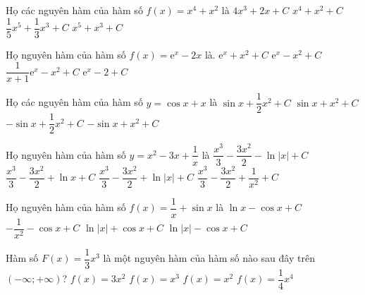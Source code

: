 \begin{ex}
	Họ các nguyên hàm của hàm số $ f(x)=x^4+x^2$ là
	\choice
	{$ 4x^3+2x+C$}
	{$x^4+x^2+C$}
	{\True $\dfrac{1}{5}{x^5}+\dfrac{1}{3}{x^3}+C$}
	{$x^5+x^3+C$}
\end{ex}
\begin{ex}
	Họ nguyên hàm của hàm số $ f(x)=\mathrm{e}^x-2x$ là.
	\choice
	{$\mathrm{e}^x+x^2+C$}
	{\True $\mathrm{e}^x-x^2+C$}
	{$\dfrac{1}{x+1}{\mathrm{e}^x}-x^2+C$}
	{$\mathrm{e}^x-2+C$}
\end{ex}
\begin{ex}
	Họ các nguyên hàm của hàm số $y=\cos x+x$ là
	\choice
	{\True $\sin x+\dfrac{1}{2}{x^2}+C$}
	{$\sin x+x^2+C$}
	{$-\sin x+\dfrac{1}{2}{x^2}+C$}
	{$-\sin x+x^2+C$}
\end{ex}
\begin{ex}
	Họ nguyên hàm của hàm số $y=x^2-3x+\dfrac{1}{x}$ là
	\choice
	{$\dfrac{x^3}{3}-\dfrac{3x^2}{2}-\ln\left| x\right|+C$}
	{$\dfrac{x^3}{3}-\dfrac{3x^2}{2}+\ln x+C$}
	{\True $\dfrac{x^3}{3}-\dfrac{3x^2}{2}+\ln\left| x\right|+C$}
	{$\dfrac{x^3}{3}-\dfrac{3x^2}{2}+\dfrac{1}{x^2}+C$}
\end{ex}
\begin{ex}
	Họ nguyên hàm của hàm số $ f(x)=\dfrac{1}{x}+\sin x$ là
	\choice
	{$\ln x-\cos x+C$}
	{$-\dfrac{1}{x^2}-\cos x+C$}
	{$\ln\left| x\right|+\cos x+C$}
	{\True $\ln\left| x\right|-\cos x+C$}
\end{ex}
\begin{ex}
	Hàm số $ F(x)=\dfrac{1}{3}{x^3}$ là một nguyên hàm của hàm số nào sau đây trên $\left(-\infty ;+\infty\right)$?
	\choice
	{$ f(x)=3x^2$}
	{$ f(x)=x^3$}
	{\True $ f(x)=x^2$}
	{$ f(x)=\dfrac{1}{4}{x^4}$}
\end{ex}
